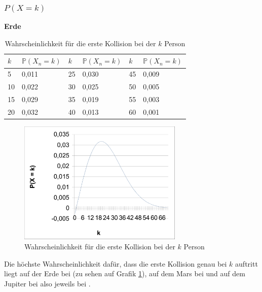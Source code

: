 \documentclass[../main.tex]{subfiles}
\begin{document}
\subsubsection{$P(X = k)$}

\textbf{Erde}

\begin{table}[h]
\centering
\begin{tabular}{|l|l|l|l|l|l|}
\hline
$k$  & $\mathbb{P}(X_{n} = k)$ & $k$  & $\mathbb{P}(X_{n} = k)$ & $k$  & $\mathbb{P}(X_{n} = k)$ \\ \hline
5  & 0,011            & 25 & 0,030            & 45 & 0,009            \\
10 & 0,022            & 30 & 0,025            & 50 & 0,005            \\
15 & 0,029            & 35 & 0,019            & 55 & 0,003            \\
20 & 0,032            & 40 & 0,013            & 60 & 0,001      \\ \hline
\end{tabular}
\caption{\label{num.tpeqe} Wahrscheinlichkeit für die erste Kollision bei der $k$ Person}
\end{table}

\begin{figure}[h]
\begin{center}
 \includegraphics[width=0.7\textwidth]{../graphics/peq.png}
\end{center}
\caption{\label{num.fpeqe} Wahrscheinlichkeit für die erste Kollision bei der $k$ Person}
\end{figure}



Die höchste Wahrscheinlichkeit dafür, dass die erste Kollision genau bei $k$ auftritt liegt auf der Erde bei  (zu sehen auf Grafik \ref{num.fpeqe}), auf dem Mars bei  und auf dem Jupiter bei  also jeweils bei .
\end{document}

